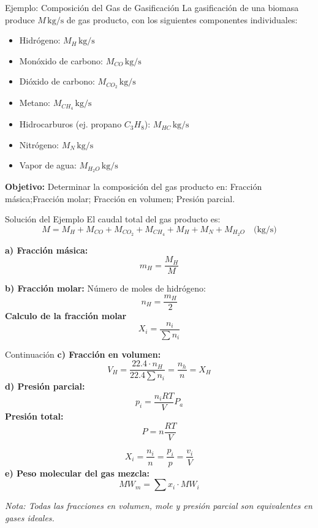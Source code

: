 \documentclass[../../main.tex]{subfiles}
\begin{document}
\begin{frame}{Ejemplo: Composición del Gas de Gasificación}
\justifying
La gasificación de una biomasa produce \( M \, \text{kg/s} \) de gas producto, con los siguientes componentes individuales:

\begin{itemize}
  \item Hidrógeno: \( M_{H} \, \text{kg/s} \)
  \item Monóxido de carbono: \( M_{CO} \, \text{kg/s} \)
  \item Dióxido de carbono: \( M_{CO_2} \, \text{kg/s} \)
  \item Metano: \( M_{CH_4} \, \text{kg/s} \)
  \item Hidrocarburos (ej. propano \( C_3H_8 \)): \( M_{HC} \, \text{kg/s} \)
  \item Nitrógeno: \( M_{N} \, \text{kg/s} \)
  \item Vapor de agua: \( M_{H_2O} \, \text{kg/s} \)
\end{itemize}

\textbf{Objetivo:} Determinar la composición del gas producto en: Fracción másica;Fracción molar; Fracción en volumen; Presión parcial.

\end{frame}


\begin{frame}{Solución del Ejemplo}
\justifying
El caudal total del gas producto es:
\[
M = M_H + M_{CO} + M_{CO_2} + M_{CH_4} + M_{H} + M_N + M_{H_2O} \quad \text{(kg/s)}
\]

\textbf{a) Fracción másica:}
\[
m_H = \frac{M_H}{M}
\]

\textbf{b) Fracción molar:}  
Número de moles de hidrógeno:
\[
n_H = \frac{m_H}{2}
\]
\textbf{Calculo de la fracción molar}
\[
X_i = \frac{n_i}{\sum n_i}
\]

\end{frame}

\begin{frame}{Continuación}
\footnotesize
\textbf{c) Fracción en volumen:}  
\[
V_H = \frac{22.4 \cdot n_H}{22.4\sum n_i} =\frac{n_h}{n}=X_H
\]
\textbf{d) Presión parcial:}
\[
p_i = \frac{n_i RT}{V}P_a
\]
\textbf{Presión total:}
\[P=n\frac{RT}{V}\]

\[X_i =\frac{n_i}{n}=\frac{p_i}{p}=\frac{v_i}{V}\]
\textbf{e) Peso molecular del gas mezcla:}
\[
MW_m = \sum x_i \cdot MW_i
\]

\textit{Nota: Todas las fracciones en volumen, mole y presión parcial son equivalentes en gases ideales.}
\end{frame}
\end{document}

